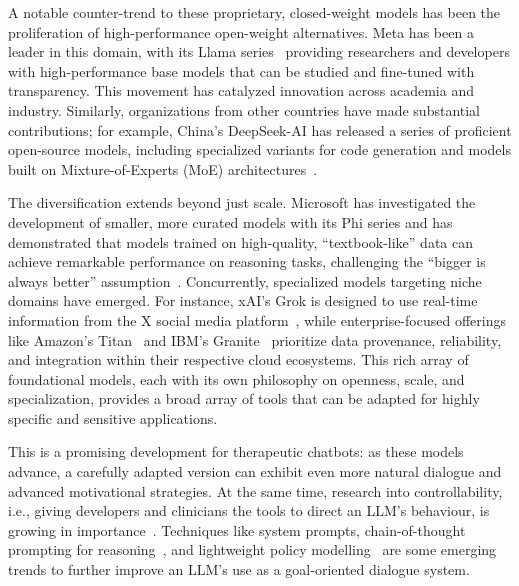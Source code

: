 A notable counter-trend to these proprietary, closed-weight models has been the proliferation of high-performance open-weight alternatives. Meta has been a leader in this domain, with its Llama series~\cite{touvron2023llama} providing researchers and developers with high-performance base models that can be studied and fine-tuned with transparency. This movement has catalyzed innovation across academia and industry. Similarly, organizations from other countries have made substantial contributions; for example, China's DeepSeek-AI has released a series of proficient open-source models, including specialized variants for code generation and models built on Mixture-of-Experts (MoE) architectures~\cite{deepseek2024deepseekv2}.

The diversification extends beyond just scale. Microsoft has investigated the development of smaller, more curated models with its Phi series and has demonstrated that models trained on high-quality, ``textbook-like'' data can achieve remarkable performance on reasoning tasks, challenging the ``bigger is always better'' assumption~\cite{li2023textbooks}. Concurrently, specialized models targeting niche domains have emerged. For instance, xAI's Grok is designed to use real-time information from the X social media platform~\cite{xai2023grok}, while enterprise-focused offerings like Amazon's Titan~\cite{aws2023titan} and IBM's Granite~\cite{ibm2023granite} prioritize data provenance, reliability, and integration within their respective cloud ecosystems. This rich array of foundational models, each with its  own philosophy on openness, scale, and specialization, provides a broad array of tools that can be adapted for highly specific and sensitive applications.

This is a promising development for therapeutic chatbots: as these models advance, a carefully adapted version can exhibit even more natural dialogue and advanced motivational strategies. At the same time, research into controllability, i.e., giving developers and clinicians the tools to direct an LLM's behaviour, is growing in importance~\cite{fernandez-etal-2025-lamia}. Techniques like system prompts, chain-of-thought prompting for reasoning~\cite{10.5555/3600270.3602070}, and lightweight policy modelling~\cite{du-etal-2024-rewarding} are some emerging trends to further improve an LLM's use as a goal-oriented dialogue system.


